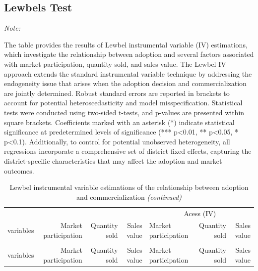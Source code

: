 \documentclass[
]{article}
\begin{document}
\hypertarget{lewbels-test}{%
\subsection{Lewbels Test}\label{lewbels-test}}

\begingroup\fontsize{7}{9}\selectfont

\begin{ThreePartTable}
\begin{TableNotes}[para]
\item \textit{Note: } 
\item The table provides the results of Lewbel instrumental variable (IV) estimations, which investigate the relationship between adoption and several factors associated with market participation, quantity sold, and sales value. The Lewbel IV approach extends the standard instrumental variable technique by addressing the endogeneity issue that arises when the adoption decision and commercialization are jointly determined. Robust standard errors are reported in brackets to account for potential heteroscedasticity and model misspecification. Statistical tests were conducted using two-sided t-tests, and p-values are presented within square brackets. Coefficients marked with an asterisk (*) indicate statistical significance at predetermined levels of significance (*** p<0.01, ** p<0.05, * p<0.1). Additionally, to control for potential unobserved heterogeneity, all regressions incorporate a comprehensive set of district fixed effects, capturing the district-specific characteristics that may affect the adoption and market outcomes.
\end{TableNotes}
\begin{longtable}[t]{lrrrlrr}
\caption{\label{tab:unnamed-chunk-16}Lewbel instrumental variable estimations of the relationship between adoption and commercialization}\\
\toprule
\multicolumn{1}{c}{ } & \multicolumn{1}{c}{ } & \multicolumn{1}{c}{ } & \multicolumn{1}{c}{ } & \multicolumn{3}{c}{Acess (IV)} \\
\cmidrule(l{3pt}r{3pt}){5-7}
variables & Market participation & Quantity sold & Sales value & Market participation & Quantity sold & Sales value\\
\midrule
\endfirsthead
\caption[]{\label{tab:unnamed-chunk-16}Lewbel instrumental variable estimations of the relationship between adoption and commercialization \textit{(continued)}}\\
\toprule
variables & Market participation & Quantity sold & Sales value & Market participation & Quantity sold & Sales value\\
\midrule
\endhead


\end{longtable}
\end{ThreePartTable}
\end{document}
